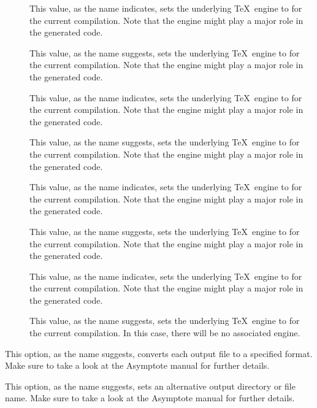 \begin{description}
\begin{description}
\begin{description}
\item[] This value, as the name indicates, sets the underlying \TeX\ engine to  for the current compilation. Note that the engine might play a major role in the generated code.

\item[] This value, as the name suggests, sets the underlying \TeX\ engine to  for the current compilation. Note that the engine might play a major role in the generated code.

\item[] This value, as the name indicates, sets the underlying \TeX\ engine to  for the current compilation. Note that the engine might play a major role in the generated code.

\item[] This value, as the name suggests, sets the underlying \TeX\ engine to  for the current compilation. Note that the engine might play a major role in the generated code.

\item[] This value, as the name indicates, sets the underlying \TeX\ engine to  for the current compilation. Note that the engine might play a major role in the generated code.

\item[] This value, as the name suggests, sets the underlying \TeX\ engine to  for the current compilation. Note that the engine might play a major role in the generated code.

\item[] This value, as the name indicates, sets the underlying \TeX\ engine to  for the current compilation. Note that the engine might play a major role in the generated code.

\item[] This value, as the name suggests, sets the underlying \TeX\ engine to  for the current compilation. In this case, there will be no associated engine.
\end{description}

\item[\abox{format}] This option, as the name suggests, converts each output file to a specified format. Make sure to take a look at the Asymptote manual for further details.

\item[\abox{output}] This option, as the name suggests, sets an alternative output directory or file name. Make sure to take a look at the Asymptote manual for further details.


\end{description}
\end{description}
